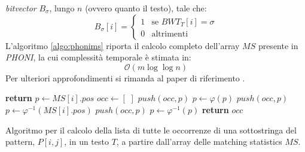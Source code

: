 \textit{bitvector} $B_{\sigma}$, lungo $n$ (ovvero quanto il testo), tale che:
\[B_{\sigma}[i]=
  \begin{cases}
    1&\mbox{se } BWT_T[i]=\sigma\\
    0&\mbox{altrimenti}
  \end{cases}
 \]
L'algoritmo \ref{algo:phonims} \cite{phoni}
riporta il calcolo completo dell'array $MS$ presente in \textit{PHONI}, la cui
complessità temporale è stimata in:
\[\mathcal{O}(m\log\log n)\]
Per ulteriori approfondimenti si rimanda al paper di riferimento
\cite{phoni}.
\begin{algorithm}
  \small
  \begin{algorithmic}[1]
    \State \textbf{return}
    \EndIf
    \State $p\gets MS[i].pos$
    \State $occ\gets [\,\,]$
    \State $push(occ, p)$
    \State $p\gets \varphi(p)$
    \State $push(occ, p)$
    \EndWhile
    \State $p\gets \varphi^{-1}(MS[i].pos)$
    \State $push(occ, p)$
    \State $p\gets \varphi^{-1}(p)$
    \EndWhile
    \State \textbf{return} $occ$
    \EndFunction
  \end{algorithmic}
  \caption{Algoritmo per il calcolo della lista di tutte le occorrenze di una
  sottostringa del pattern, $P[i,j]$, in un testo $T$, a partire dall'array
  delle matching statistics $MS$.}
  \label{algo:expand}
\end{algorithm}

